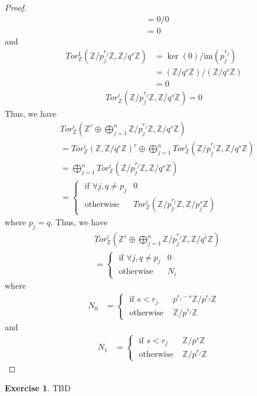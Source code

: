 \documentclass[12pt]{extarticle}
\newcommand{\im}{\text{im}}
\newcommand{\Z}{\mathbb{Z}}
\newcommand{\<}{\langle}
\renewcommand{\>}{\rangle}
\theoremstyle{definition}
\newtheorem{exercise}{Exercise}
\begin{document}
\begin{proof}
\begin{align*}
    &= 0/0 \\
    &= 0
  \end{align*}
  and
  \begin{align*}
    Tor_{\Z}^1(\Z/p_j^{r_j}\Z, \Z/q^s\Z) &= \ker(0)/\im(p_j^{r_j}) \\
    &= (\Z/q^s\Z)/(\Z/q^s\Z) \\
    &= 0 
  \end{align*}
  \begin{align*}
    Tor_{\Z}^i(\Z/p_j^{r_j}\Z, \Z/q^s\Z) = 0
  \end{align*}
  Thus, we have
  \begin{align*}
    &Tor_{\Z}^i(\Z^r \oplus \bigoplus\limits_{j=1}^n \Z/p_j^{r_j}\Z, \Z/q^s\Z)  \\
    &= Tor_{\Z}^i(\Z, \Z/q^s\Z)^r \oplus \bigoplus\limits_{j=1}^n Tor_{\Z}^i(\Z/p_j^{r_j}\Z, \Z/q^s\Z) \\
    &= \bigoplus\limits_{j=1}^n Tor_{\Z}^i(\Z/p_j^{r_j}\Z, \Z/q^s\Z) \\
    &= 
    \begin{cases}
      \text { if } \forall j, q \neq p_j & 0 \\
      \text { otherwise } & Tor_{\Z}^i(\Z/p_j^{r_j}\Z, \Z/p_j^s\Z)
    \end{cases}
  \end{align*}
  where $p_j = q$. 
  Thus, we have
  \begin{align*}
    &Tor_{\Z}^i(\Z^r \oplus \bigoplus\limits_{j=1}^n \Z/p_j^{r_j}\Z, \Z/q^s\Z)  \\
    &=
    \begin{cases}
      \text { if } \forall j, q \neq p_j & 0 \\
      \text { otherwise } & N_i
    \end{cases}
  \end{align*}
  where
  \begin{align*}
    N_0 &=
    \begin{cases}
      \text{ if } s<r_j & p^{r_j-s}\Z/ p^{r_j} \Z \\
      \text{ otherwise } & \Z / p^{r_j} \Z
    \end{cases}
  \end{align*}
  and
  \begin{align*}
    N_1 &=
    \begin{cases}
      \text{ if } s<r_j & \Z/ p^s \Z \\
      \text{ otherwise } & \Z / p^{r_j} \Z      
    \end{cases}
  \end{align*}
\end{proof}
\begin{exercise}
  TBD
\end{exercise}
\end{document}
